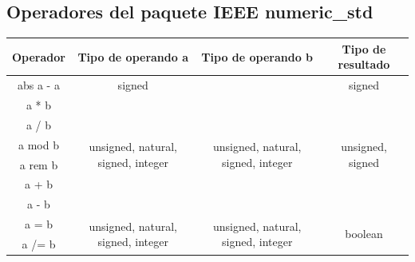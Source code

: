 \subsection{Operadores del paquete IEEE numeric\_std}
\begin{table}[H]
	\begin{tabular}{|c|c|c|c|}
		\hline
		\rowcolor{gray}
		Operador           & Tipo de operando a                                  & Tipo de operando b                                  & Tipo de resultado                 \\
		\hline
		abs a \newline - a & signed                                              &                                                     & signed                            \\
		\hline
		a * b              & \multirow{6}{*}{unsigned, natural, signed, integer} & \multirow{6}{*}{unsigned, natural, signed, integer} & \multirow{6}{*}{unsigned, signed} \\
		\cline{1-1}
		a / b              &                                                     &                                                     &                                   \\
		\cline{1-1}
		a mod b            &                                                     &                                                     &                                   \\
		\cline{1-1}
		a rem b            &                                                     &                                                     &                                   \\
		\cline{1-1}
		a + b              &                                                     &                                                     &                                   \\
		\cline{1-1}
		a - b              &                                                     &                                                     &                                   \\
		\hline
		a = b              & \multirow{6}{*}{unsigned, natural, signed, integer} & \multirow{6}{*}{unsigned, natural, signed, integer} & \multirow{6}{*}{boolean}          \\
		\cline{1-1}
		a /= b             &                                                     &                                                     &                                   \\
		\cline{1-1}

\end{tabular}
\end{table}
